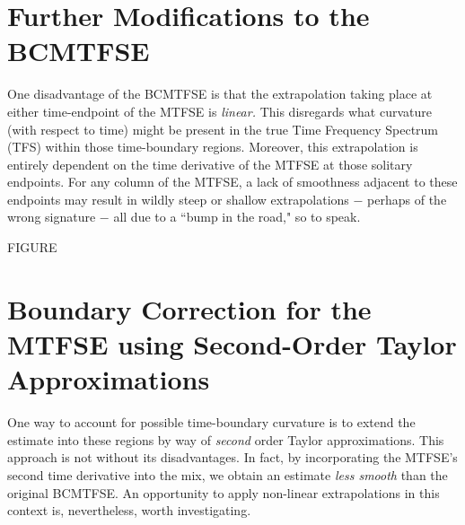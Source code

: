\documentclass{article}
\begin{document}
\pagecolor{salt}\color{pepper}

\section{Further Modifications to the BCMTFSE}
One disadvantage of the BCMTFSE is that the extrapolation taking place at either time-endpoint of the MTFSE is \textit{linear.} This disregards what curvature (with respect to time) might be present in the true Time Frequency Spectrum (TFS) within those time-boundary regions. Moreover, this extrapolation is entirely dependent on the time derivative of the MTFSE at those solitary endpoints. For any column of the MTFSE, a lack of smoothness adjacent to these endpoints may result in wildly steep or shallow extrapolations $-$ perhaps of the wrong signature $-$ all due to a ``bump in the road," so to speak.

FIGURE

\section{Boundary Correction for the MTFSE using Second-Order Taylor Approximations}
One way to account for possible time-boundary curvature is to extend the estimate into these regions by way of \textit{second} order Taylor approximations. This approach is not without its disadvantages. In fact, by incorporating the MTFSE's second time derivative into the mix, we obtain an estimate \textit{less smooth} than the original BCMTFSE. An opportunity to apply non-linear extrapolations in this context is, nevertheless, worth investigating.
\end{document}
